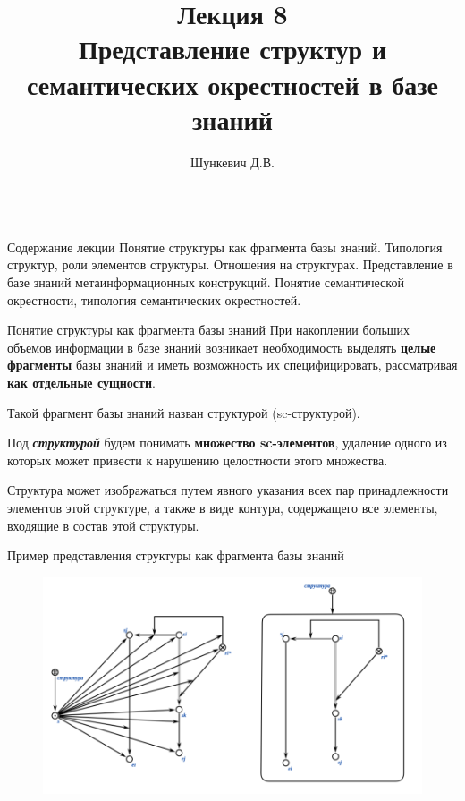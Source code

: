 \title{Лекция 8\\Представление структур и семантических окрестностей в базе знаний}   
\author[]{Шункевич Д.В.}

\begin{frame}
	\titlepage
\end{frame}

\begin{frame}{\\Содержание лекции}
	\topline
	\justifying
	Понятие структуры как фрагмента базы знаний. Типология структур, роли элементов структуры. Отношения на структурах. Представление в базе знаний метаинформационных конструкций. Понятие семантической окрестности, типология семантических окрестностей.
\end{frame}

\begin{frame}{Понятие структуры как фрагмента базы знаний}
	\topline
	\justifying
	При накоплении больших	объемов информации в базе знаний возникает необходимость выделять \textbf{целые фрагменты} базы знаний и иметь возможность их специфицировать, рассматривая \textbf{как отдельные сущности}.
	
	Такой фрагмент базы знаний назван структурой (sc-структурой).
	
	Под \textbf{\textit{структурой}} будем понимать \textbf{множество
	sc-элементов}, удаление одного из которых может привести к нарушению целостности этого множества.

	Структура может изображаться путем явного указания всех пар принадлежности элементов этой структуре, а также в виде контура, содержащего все элементы, входящие в состав этой структуры.
\end{frame}

\begin{frame}{Пример представления структуры как фрагмента базы знаний}
	\topline
	\justifying
	\begin{figure}[H]
		\includegraphics[scale=0.33]{./figures/sd_structures/structure.png}
	\end{figure}
\end{frame}

